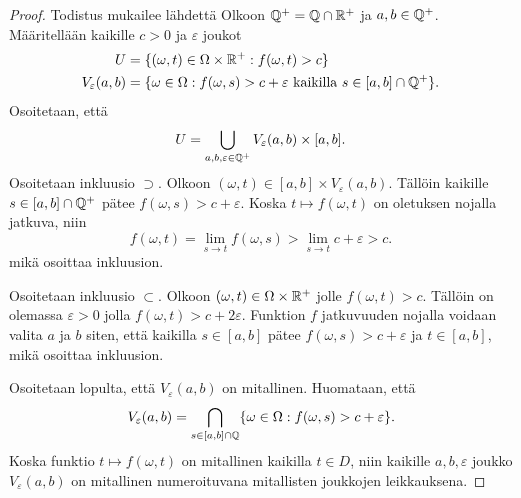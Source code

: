 \documentclass[12pt,oneside,a4paper]{amsbook} %
\begin{document}
\begin{proof}
    Todistus mukailee lähdettä \cite{optimal}
    Olkoon $\mathbb{Q}^{+} = \mathbb{Q} \cap {\mathbb{R}^{+}}$ ja $a, b \in \mathbb{Q}^{+}$. Määritellään kaikille $c > 0$ ja $\varepsilon$ joukot 
    \begin{align*}
        U &= \{(\omega, t) \in \Omega\times {\mathbb{R}^{+}} : f(\omega, t) > c\} \\
        V_\varepsilon(a, b) &= \{\omega \in \Omega : f(\omega, s) > c + \varepsilon \text{ kaikilla } s \in [a,b]\cap \mathbb{Q}^{+}\}.
    \end{align*}
Osoitetaan, että
\begin{equation*}
    U = \bigcup_{a, b, \varepsilon \in \mathbb{Q}^{+}} V_\varepsilon(a,b) \times [a,b].
\end{equation*}
Osoitetaan inkluusio $\supset$. Olkoon $(\omega, t) \in [a, b] \times V_\varepsilon(a, b)$. Tällöin kaikille $s\in [a, b] \cap \mathbb{Q}^{+}$ pätee $f(\omega, s) > c + \varepsilon$. Koska $t \mapsto f(\omega, t)$ on oletuksen nojalla jatkuva, niin 
    \begin{equation*}
        f(\omega, t) = \lim_{s\to t} f(\omega, s) > \lim_{s\to t} c + \varepsilon > c.
    \end{equation*}
mikä osoittaa inkluusion. 

Osoitetaan inkluusio $\subset$. Olkoon $(\omega, t) \in \Omega \times {\mathbb{R}^{+}} $ jolle $f(\omega, t) > c$. Tällöin on olemassa $\varepsilon > 0$ jolla $f(\omega, t) > c + 2\varepsilon$. Funktion $f$ jatkuvuuden nojalla voidaan valita $a$ ja $b$ siten, että kaikilla $s \in [a, b]$ pätee $f(\omega, s) > c + \varepsilon$ ja $t\in [a,b]$, mikä osoittaa inkluusion.

Osoitetaan lopulta, että $V_\varepsilon(a,b)$ on mitallinen. Huomataan, että
\begin{equation*}
    V_\varepsilon(a,b) = \bigcap_{s \in [a,b]\cap \mathbb{Q}}\{\omega \in \Omega : f(\omega, s) > c + \varepsilon\}.
\end{equation*}
Koska funktio $t \mapsto f(\omega, t)$ on mitallinen kaikilla $t \in D$, niin kaikille $a, b, \varepsilon$ joukko $V_\varepsilon(a, b)$ on mitallinen numeroituvana mitallisten joukkojen leikkauksena.
\end{proof}
\end{document}
